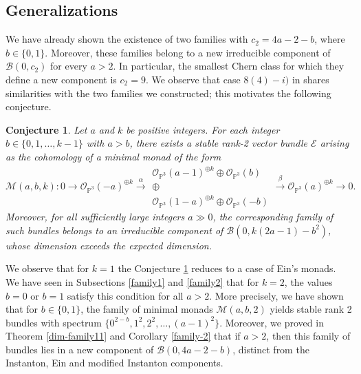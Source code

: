 \documentclass[twoside,reqno]{amsart}
\theoremstyle{plain}
\newtheorem{conjecture}[theorem]{Conjecture}
\newcommand{\lra}{\longrightarrow}
\newcommand{\cM}{\mathcal{M}}
\begin{document}
\subsection{Generalizations}
We have already shown the existence of two families with $c_2=4a-2-b$, where $b\in\{0,1\}$. Moreover, these families belong to a new irreducible component of $\mathcal{B}(0,c_2)$ for every $a>2$. In particular, the smallest Chern class for which they define a new component is $c_2=9$. We observe that case $8(4)-i)$ in \cite[Table 5.3]{HR91} shares similarities with the two families we constructed; this motivates the following conjecture.
\begin{conjecture}\label{conjecture}
 Let \(a\) and \(k\) be positive integers. For each integer \(b\in\{0,1,\dots,k-1\}\) with \(a>b\), there exists a stable rank-2 vector bundle \(\mathcal{E}\) arising as the cohomology of a minimal monad of the form
\begin{equation}\label{general-monad}
    \cM(a, b,k) : 0 \lra {\mathcal{O}_{\mathbb{P}^{3}}(-a)}^{\oplus k} \stackrel{\alpha}{\lra} \begin{matrix} {\mathcal{O}_{\mathbb{P}^{3}}(a-1)}^{\oplus k} \oplus \mathcal{O}_{\mathbb{P}^{3}}(b) \\ \displaystyle \oplus \\ {\mathcal{O}_{\mathbb{P}^{3}}(1-a)}^{\oplus k}\oplus\mathcal{O}_{\mathbb{P}^{3}}(-b) 
\end{matrix} \stackrel{\beta}{\lra} {\mathcal{O}_{\mathbb{P}^{3}}(a)}^{\oplus k} \lra 0.
\end{equation}
Moreover, for all sufficiently large integers \(a \gg 0\), the corresponding family of such bundles belongs to an irreducible component of  \(\mathcal{B}(0,k(2a-1)-b^2)\), whose dimension exceeds the expected dimension. 
\end{conjecture}

We observe that for $k=1$ the Conjecture \ref{conjecture} reduces to a case of Ein's monads. We have seen 
in Subsections \ref{family1} and \ref{family2} that for \(k=2\), the values \(b=0\) or \(b=1\) satisfy this 
condition for all \(a>2\). More precisely, we have shown that for 
\(b \in \{0,1\}\), the family of minimal monads \(\cM(a,b,2)\) yields stable rank 2 bundles with spectrum 
\(\{0^{2-b}, 1^2, 2^2, \dots, (a-1)^{2}\}\). Moreover, we proved in Theorem \ref{dim-family11} and Corollary 
\ref{family-2} that if \(a>2\), then this family of bundles lies in a new component 
of \(\mathcal{B}(0,4a-2-b)\), distinct from the 
Instanton, Ein and modified Instanton components.
\end{document}
